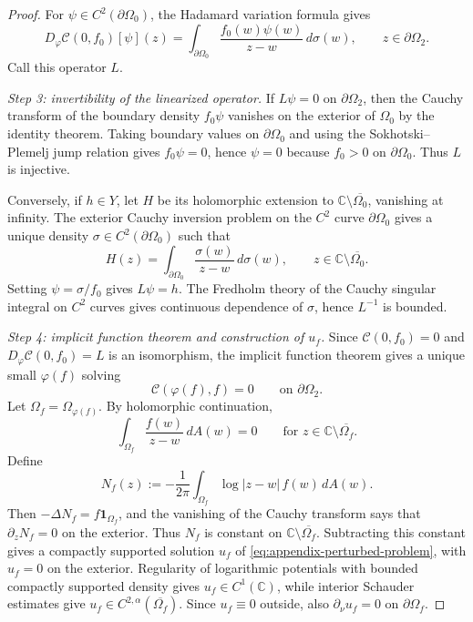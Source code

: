 \documentclass[a4paper,11pt,reqno]{amsart}
\numberwithin{equation}{section}
\theoremstyle{plain} %
\theoremstyle{definition} %
\theoremstyle{remark}
\newcommand{\C}{\mathbb{C}}
\begin{document}
\begin{proof}
For \(\psi\in C^2(\partial\Omega_0)\), the Hadamard variation formula gives
\begin{equation}\label{eq:appendix-shape-derivative-null}
D_\varphi\mathcal C(0,f_0)[\psi](z)
=
\int_{\partial\Omega_0}\frac{f_0(w)\psi(w)}{z-w}\,d\sigma(w),
\qquad z\in\partial\Omega_2 .
\end{equation}
Call this operator \(L\).

\medskip
\noindent\emph{Step 3: invertibility of the linearized operator.}
If \(L\psi=0\) on \(\partial\Omega_2\), then the Cauchy transform of the
boundary density \(f_0\psi\) vanishes on the exterior of \(\Omega_0\) by the
identity theorem. Taking boundary values on \(\partial\Omega_0\) and using the
Sokhotski--Plemelj jump relation gives \(f_0\psi=0\), hence \(\psi=0\) because
\(f_0>0\) on \(\partial\Omega_0\). Thus \(L\) is injective.

Conversely, if \(h\in Y\), let \(H\) be its holomorphic extension to
\(\C\setminus\overline{\Omega_0}\), vanishing at infinity. The exterior
Cauchy inversion problem on the \(C^2\) curve \(\partial\Omega_0\) gives a
unique density \(\sigma\in C^2(\partial\Omega_0)\) such that
\[
H(z)=\int_{\partial\Omega_0}\frac{\sigma(w)}{z-w}\,d\sigma(w),
\qquad z\in\C\setminus\overline{\Omega_0}.
\]
Setting \(\psi=\sigma/f_0\) gives \(L\psi=h\). The Fredholm theory of the
Cauchy singular integral on \(C^2\) curves gives continuous dependence of
\(\sigma\), hence \(L^{-1}\) is bounded.

\medskip
\noindent\emph{Step 4: implicit function theorem and construction of \(u_f\).}
Since \(\mathcal C(0,f_0)=0\) and \(D_\varphi\mathcal C(0,f_0)=L\) is an
isomorphism, the implicit function theorem gives a unique small
\(\varphi(f)\) solving
\[
\mathcal C(\varphi(f),f)=0
\qquad\text{on }\partial\Omega_2 .
\]
Let \(\Omega_f=\Omega_{\varphi(f)}\). By holomorphic continuation,
\[
\int_{\Omega_f}\frac{f(w)}{z-w}\,dA(w)=0
\qquad\text{for }z\in\C\setminus\overline{\Omega_f}.
\]
Define
\[
N_f(z):=-\frac1{2\pi}\int_{\Omega_f}\log|z-w|\,f(w)\,dA(w).
\]
Then \(-\Delta N_f=f\mathbf 1_{\Omega_f}\), and the vanishing of the Cauchy
transform says that \(\partial_zN_f=0\) on the exterior. Thus \(N_f\) is
constant on \(\C\setminus\overline{\Omega_f}\). Subtracting this constant
gives a compactly supported solution \(u_f\) of
\eqref{eq:appendix-perturbed-problem}, with \(u_f=0\) on the exterior.
Regularity of logarithmic potentials with bounded compactly supported density
gives \(u_f\in C^1(\C)\), while interior Schauder estimates give
\(u_f\in C^{2,\alpha}(\overline{\Omega_f})\). Since \(u_f\equiv0\) outside,
also \(\partial_\nu u_f=0\) on \(\partial\Omega_f\).


\end{proof}
\end{document}
